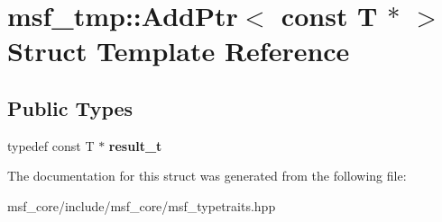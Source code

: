 \hypertarget{structmsf__tmp_1_1AddPtr_3_01const_01T_01_5_01_4}{\section{msf\-\_\-tmp\-:\-:Add\-Ptr$<$ const T $\ast$ $>$ Struct Template Reference}
\label{structmsf__tmp_1_1AddPtr_3_01const_01T_01_5_01_4}
}
\subsection*{Public Types}
\begin{DoxyCompactItemize}
\item 
\hypertarget{structmsf__tmp_1_1AddPtr_3_01const_01T_01_5_01_4_a826780f33bde2bbf4c5df2e74b3e4c88}{typedef const T $\ast$ {\bfseries result\-\_\-t}}\label{structmsf__tmp_1_1AddPtr_3_01const_01T_01_5_01_4_a826780f33bde2bbf4c5df2e74b3e4c88}

\end{DoxyCompactItemize}


The documentation for this struct was generated from the following file\-:\begin{DoxyCompactItemize}
\item 
msf\-\_\-core/include/msf\-\_\-core/msf\-\_\-typetraits.\-hpp\end{DoxyCompactItemize}
